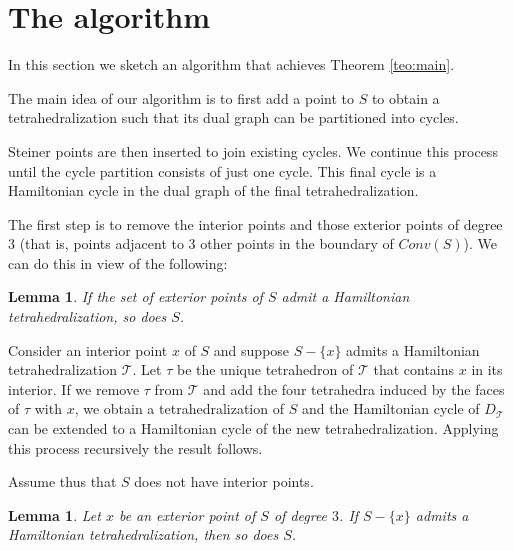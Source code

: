 \documentclass{article}
\newtheorem{lemma}[theorem]{Lemma}
\def\QED{\ensuremath{{\square}}}
\def\markatright#1{\leavevmode\unskip\nobreak\quad\hspace*{\fill}{#1}}
\newenvironment{proof}
  {\begin{trivlist}\item[\hskip\labelsep{\bf Proof.}]}
  {\markatright{\QED}\end{trivlist}}
\newcommand{\Conv}{\mathit{Conv}}
\begin{document}
\section{The algorithm}\label{join}



In this section we sketch an algorithm that achieves Theorem \ref{teo:main}.\par

The main idea of our algorithm is to first add a point to $S$  to obtain
a tetrahedralization such that its dual graph can be
partitioned into cycles.\par

Steiner points are then inserted to join existing 
cycles. We continue this process until
the cycle partition consists of just one cycle. This final
cycle is a Hamiltonian cycle in the dual graph of the final
tetrahedralization.\par

The first step is to remove the interior points and 
those exterior points of degree $3$ (that is, points
adjacent to $3$ other points in the boundary of $\Conv(S)$).
We can do this in view of the following: 

\begin{lemma}\label{obsconv}
  If the set of exterior points of $S$ admit a Hamiltonian 
  tetrahedralization, so does $S$.
 \end{lemma}
 
\begin{proof}
Consider an interior point $x$ of $S$ and suppose 
$S-\{x\}$ admits a Hamiltonian tetrahedralization $\mathcal{T}$.
Let $\tau$ be the unique tetrahedron of $\mathcal{T}$ that 
contains $x$ in its interior. If we remove $\tau$ from
$\mathcal{T}$ and add the four tetrahedra induced by
the faces of $\tau$ with $x$, 
we obtain a tetrahedralization of $S$ and 
the Hamiltonian cycle of  $D_{\mathcal{T}}$ can be extended 
to a Hamiltonian cycle of the new tetrahedralization.
Applying this process recursively the result follows.
\end{proof} 

Assume thus that $S$ does not have interior points.

\begin{lemma} \label{theo1}
Let $x$ be an exterior point of $S$ of degree $3$. If 
$S-\{x\}$ admits a Hamiltonian tetrahedralization, then so does
$S$.
\end{lemma}
\end{document}
